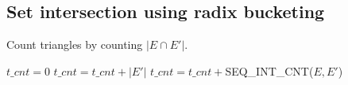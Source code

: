 \documentclass[conference]{IEEEtran}
\begin{document}






\subsection{Set intersection using radix bucketing}
\begin{algorithm}
  \caption{Count triangles by counting $|E \cap E'|$.\label{tri_count}}
  \begin{algorithmic}[1]
    \Statex
    \State $t\_cnt = 0$    
	\State \Return{}
      \EndIf
	\State $t\_cnt = t\_cnt + |E'|$
	\State \Return{}
      \EndIf
	\State $t\_cnt = t\_cnt +$SEQ\_INT\_CNT($E, E'$)
	\State \Return{}
      \EndIf      
    \EndFunction
  \end{algorithmic}
\end{algorithm}
\end{document}
